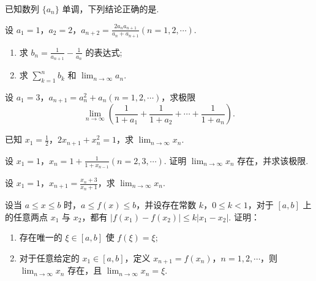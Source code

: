	\begin{ti}
		已知数列 $\{ a_{n} \}$ 单调，下列结论正确的是\kuo.
		
	\end{ti}

	\begin{ti}
		设 $a_{1} = 1$，$a_{2} = 2$，$a_{n+2} = \frac{2a_{n}a_{n+1}}{a_{n} + a_{n+1}} (n=1,2,\cdots)$.
		\begin{enumerate}
			\item 求 $b_{n} = \frac{1}{a_{n+1}} - \frac{1}{a_{n}}$ 的表达式;
			\item 求 $\sum_{k=1}^{n} b_{k}$ 和 $\lim_{n \to \infty} a_{n}$.
		\end{enumerate}
	\end{ti}

	\begin{ti}
		设 $a_{1} = 3$，$a_{n+1} = a_{n}^{2} + a_{n}(n = 1,2,\cdots)$，求极限
		\[
			\lim_{n \to \infty} \left( \frac{1}{1 + a_{1}} + \frac{1}{1 + a_{2}} + \cdots + \frac{1}{1 + a_{n}} \right).
		\]
	\end{ti}
	
	\begin{ti}
		已知 $x_{1} = \frac{1}{2}$，$2 x_{n+1} + x_{n}^{2} = 1$，求 $\lim_{n \to \infty} x_{n}$.
	\end{ti}

	\begin{ti}
		设 $x_{1} = 1$，$x_{n} = 1 + \frac{1}{1 + x_{n-1}}(n = 2,3,\cdots)$. 证明 $\lim_{n \to \infty} x_{n}$ 存在，并求该极限.
	\end{ti}

	\begin{ti}
		设 $x_{1} = 1$，$x_{n+1} = \frac{x_{n} + 3}{x_{n} + 1}$，求 $\lim_{n \to \infty} x_{n}$.
	\end{ti}

	\begin{ti}
		设当 $a \leq x \leq b$ 时，$a \leq f(x) \leq b$，并设存在常数 $k$，$0 \leq k < 1$，对于 $[a,b]$ 上的任意两点 $x_{1}$ 与 $x_{2}$，都有 $|f(x_{1}) - f(x_{2})| \leq k |x_{1} - x_{2}|$. 证明：
		\begin{enumerate}
			\item 存在唯一的 $\xi \in [a,b]$ 使 $f(\xi) = \xi$;
			\item 对于任意给定的 $x_{1} \in [a,b]$，定义 $x_{n+1} = f(x_{n})$，$n = 1,2,\cdots$，则 $\lim_{n \to \infty} x_{n}$ 存在，且 $\lim_{n \to \infty} x_{n} = \xi$.
		\end{enumerate}
	\end{ti}

